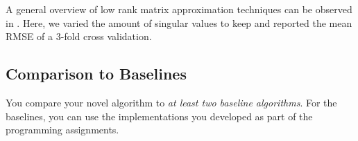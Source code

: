 \documentclass[10pt,conference,compsocconf]{IEEEtran}
\begin{document}
    A general overview of low rank matrix approximation techniques can be observed in .
    Here, we varied the amount of singular values to keep and reported the mean RMSE of a 3-fold cross validation.

    \subsection{Comparison to Baselines}

    You compare your novel algorithm to \emph{at least two baseline
    algorithms}. For the baselines, you can use the implementations you
    developed as part of the programming assignments.
\end{document}
